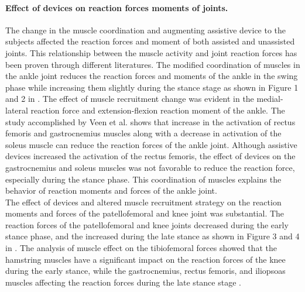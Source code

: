 \documentclass[10pt,letterpaper]{article}
\begin{document}
\paragraph*{Effect of devices on reaction forces moments of joints.} The change in the muscle coordination and augmenting assistive device to the subjects affected the reaction forces and moment of both assisted and unassisted joints. This relationship between the muscle activity and joint reaction forces has been proven through different literatures\cite{171,170,173,174}. The modified coordination of muscles in the ankle joint reduces the reaction forces and moments of the ankle in the swing phase while increasing them slightly during the stance stage as shown in Figure 1 and 2 in . The effect of muscle recruitment change was evident in the medial-lateral reaction force and extension-flexion reaction moment of the ankle. The study accomplished by Veen et al. \cite{170} shows that increase in the activation of rectus femoris and gastrocnemius muscles along with a decrease in activation of the soleus muscle can reduce the reaction forces of the ankle joint. Although assistive devices increased the activation of the rectus femoris, the effect of devices on the gastrocnemius and soleus muscles was not favorable to reduce the reaction force, especially during the stance phase. This coordination of muscles explains the behavior of reaction moments and forces of the ankle joint.\\
The effect of devices and altered muscle recruitment strategy on the reaction moments and forces of the patellofemoral and knee joint was substantial. The reaction forces of the patellofemoral and knee joints decreased during the early stance phase, and the increased during the late stance as shown in Figure 3 and 4 in . The analysis of muscle effect on the tibiofemoral forces showed that the hamstring muscles have a significant impact on the reaction forces of the knee during the early stance, while the gastrocnemius, rectus femoris, and iliopsoas muscles affecting the reaction forces during the late stance stage \cite{171,170}.\\
\end{document}
